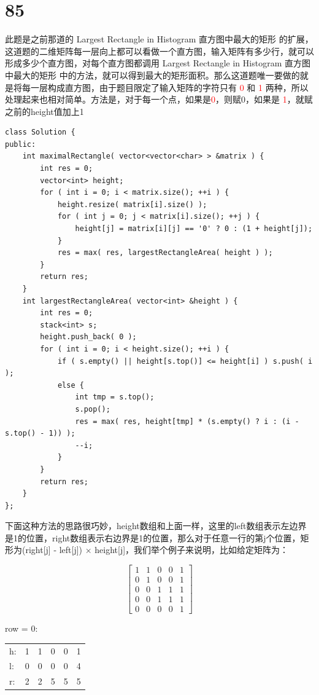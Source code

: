 \documentclass[12pt,a4paper]{article}
\begin{document}
\section{85}
\begin{CJK}{UTF8}{gbsn}
此题是之前那道的 Largest Rectangle in Histogram 直方图中最大的矩形 的扩展，这道题的二维矩阵每一层向上都可以看做一个直方图，输入矩阵有多少行，就可以形成多少个直方图，对每个直方图都调用 Largest Rectangle in Histogram 直方图中最大的矩形 中的方法，就可以得到最大的矩形面积。那么这道题唯一要做的就是将每一层构成直方图，由于题目限定了输入矩阵的字符只有 \textcolor{red}{0} 和 \textcolor{red}{1} 两种，所以处理起来也相对简单。方法是，对于每一个点，如果是\textcolor{red}{0}，则赋0，如果是 \textcolor{red}{1}，就赋 之前的height值加上1
\end{CJK}
\begin{lstlisting}
class Solution {
public:
	int maximalRectangle( vector<vector<char> > &matrix ) {
		int res = 0;
		vector<int> height;
		for ( int i = 0; i < matrix.size(); ++i ) {
			height.resize( matrix[i].size() );
			for ( int j = 0; j < matrix[i].size(); ++j ) {
				height[j] = matrix[i][j] == '0' ? 0 : (1 + height[j]);
			}
			res = max( res, largestRectangleArea( height ) );
		}
		return res;
	}
	int largestRectangleArea( vector<int> &height ) {
		int res = 0;
		stack<int> s;
		height.push_back( 0 );
		for ( int i = 0; i < height.size(); ++i ) {
			if ( s.empty() || height[s.top()] <= height[i] ) s.push( i );
			else {
				int tmp = s.top();
				s.pop();
				res = max( res, height[tmp] * (s.empty() ? i : (i - s.top() - 1)) );
				--i;
			}
		}
		return res;
	}
};
\end{lstlisting}
\begin{CJK}{UTF8}{gbsn}
下面这种方法的思路很巧妙，height数组和上面一样，这里的left数组表示左边界是1的位置，right数组表示右边界是1的位置，那么对于任意一行的第j个位置，矩形为(right[j] - left[j]) $\times$ height[j]，我们举个例子来说明，比如给定矩阵为：
\end{CJK}
\[
\begin{bmatrix}
1 & 1 & 0 & 0 & 1 \\
0 & 1 & 0 & 0 & 1 \\
0 & 0 & 1 & 1 & 1 \\
0 & 0 & 1 & 1 & 1 \\
0 & 0 & 0 & 0 & 1
\end{bmatrix}
\]
\begin{center}
row = 0:
\begin{tabular}{l*{5}{c}}
h: & 1 & 1 & 0 & 0 & 1 \\
l: & 0 & 0 & 0 & 0 & 4 \\
r: & 2 & 2 & 5 & 5 & 5 
\end{tabular}
\end{center}
\end{document}
